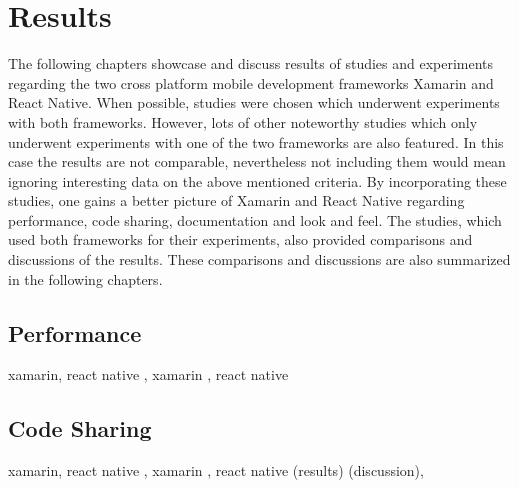 \documentclass[Bachelor,BIF,english]{twbook}
\begin{document}
\section{Results}
The following chapters showcase and discuss results of studies and experiments regarding the two cross platform mobile development frameworks Xamarin and React Native. When possible, studies were chosen which underwent experiments with both frameworks. However, lots of other noteworthy studies which only underwent experiments with one of the two frameworks are also featured. In this case the results are not comparable, nevertheless not including them would mean ignoring interesting data on the above mentioned criteria. By incorporating these studies, one gains a better picture of Xamarin and React Native regarding performance, code sharing, documentation and look and feel. The studies, which used both frameworks for their experiments, also provided comparisons and discussions of the results. These comparisons and discussions are also summarized in the following chapters.

\subsection{Performance}
xamarin, react native \cite[p.~30-32]{ZubaBernhard2017EdPb}, xamarin \cite{Armgren_2015} \cite{WillocxVossaertNaessens2015}, react native \cite[p.~67-68]{Axelsson2016} \cite[p.~34-43]{Hansson_Vidhall_2016}
\subsection{Code Sharing}
xamarin, react native \cite[p.~71-72]{ZubaBernhard2017EdPb}, xamarin \cite[p.~185]{MartinezLecomte2017}, react native (results\cite[p.~44]{Hansson_Vidhall_2016}) (discussion\cite[p.~53]{Hansson_Vidhall_2016}),
\end{document}
